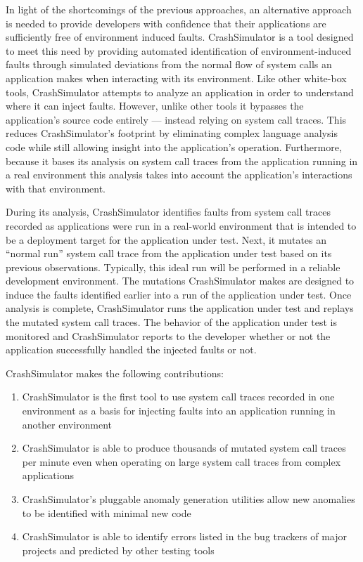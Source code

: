     In light of the shortcomings of the previous approaches, an alternative approach is needed to provide developers
    with confidence that their applications are sufficiently free of environment induced faults.  CrashSimulator is a
    tool designed to meet this need by providing automated identification of environment-induced faults through
    simulated deviations from the normal flow of system calls an application makes when interacting with its
    environment. Like other white-box tools, CrashSimulator attempts to analyze an application in order to understand
    where it can inject faults.  However, unlike other tools it bypasses the application's source code entirely ---
    instead relying on system call traces.  This reduces CrashSimulator's footprint by eliminating complex language
    analysis code while still allowing insight into the application's operation. Furthermore, because it bases its
    analysis on system call traces from the application running in a real environment this analysis takes into account
    the application's interactions with that environment.

    During its analysis, CrashSimulator identifies faults from system call traces recorded as applications were run in a
    real-world environment that is intended to be a deployment target for the application under test. Next, it mutates
    an ``normal run'' system call trace from the application under test based on its previous observations. Typically,
    this ideal run will be performed in a reliable development environment. The mutations CrashSimulator makes are
    designed to induce the faults identified earlier into a run of the application under test. Once analysis is
    complete, CrashSimulator runs the application under test and replays the mutated system call traces. The behavior of
    the application under test is monitored and CrashSimulator reports to the developer whether or not the application
    successfully handled the injected faults or not.

    CrashSimulator makes the following contributions:

    \begin{enumerate}
        \item{CrashSimulator is the first tool to use system call traces recorded in one environment as a basis for
            injecting faults into an application running in another environment}
        \item{CrashSimulator is able to produce thousands of mutated system call traces per minute even when operating
            on large system call traces from complex applications}
        \item{CrashSimulator's pluggable anomaly generation utilities allow new anomalies to be identified with minimal
            new code}
        \item{CrashSimulator is able to identify errors listed in the bug trackers of major projects and predicted by
            other testing tools}
    \end{enumerate}
